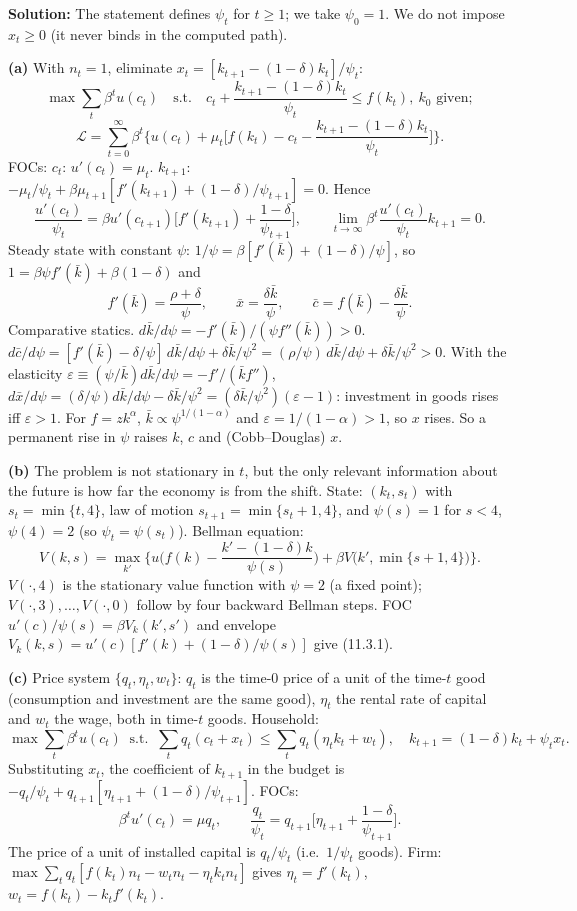 \documentclass[12pt, letterpaper]{article}
\newcommand{\kb}{\bar k}
\newcommand{\cb}{\bar c}
\begin{document}
\begin{tcolorbox}[oddbox,title={Exercise 11.3 \quad Anticipated productivity shift}]
\textbf{Solution:} The statement defines $\psi_t$ for $t\ge1$; we take $\psi_0=1$. We do not impose $x_t\ge0$ (it never
binds in the computed path).

\textbf{(a)} With $n_t=1$, eliminate $x_t=[k_{t+1}-(1-\delta)k_t]/\psi_t$:
\[
\max\sum_t\beta^tu(c_t)\quad\text{s.t.}\quad c_t+\frac{k_{t+1}-(1-\delta)k_t}{\psi_t}\le f(k_t),\ k_0\text{ given};
\]
\[
\mathcal L=\sum_{t=0}^\infty\beta^t\Big\{u(c_t)+\mu_t\Big[f(k_t)-c_t-\frac{k_{t+1}-(1-\delta)k_t}{\psi_t}\Big]\Big\}.
\]
FOCs: $c_t$: $u'(c_t)=\mu_t$. $k_{t+1}$: $-\mu_t/\psi_t+\beta\mu_{t+1}[f'(k_{t+1})+(1-\delta)/\psi_{t+1}]=0$. Hence
\[
\frac{u'(c_t)}{\psi_t}=\beta u'(c_{t+1})\Big[f'(k_{t+1})+\frac{1-\delta}{\psi_{t+1}}\Big],\qquad
\lim_{t\to\infty}\beta^t\frac{u'(c_t)}{\psi_t}k_{t+1}=0 .\tag{11.3.1}
\]
Steady state with constant $\psi$: $1/\psi=\beta[f'(\kb)+(1-\delta)/\psi]$, so $1=\beta\psi f'(\kb)+\beta(1-\delta)$ and
\[
f'(\kb)=\frac{\rho+\delta}{\psi},\qquad \bar x=\frac{\delta\kb}{\psi},\qquad \cb=f(\kb)-\frac{\delta\kb}{\psi}.
\]
Comparative statics. $d\kb/d\psi=-f'(\kb)/(\psi f''(\kb))>0$.
$d\cb/d\psi=[f'(\kb)-\delta/\psi]\,d\kb/d\psi+\delta\kb/\psi^2=(\rho/\psi)\,d\kb/d\psi+\delta\kb/\psi^2>0$.
With the elasticity $\varepsilon\equiv(\psi/\kb)d\kb/d\psi=-f'/(\kb f'')$,
$d\bar x/d\psi=(\delta/\psi)d\kb/d\psi-\delta\kb/\psi^2=(\delta\kb/\psi^2)(\varepsilon-1)$: investment in goods rises iff
$\varepsilon>1$. For $f=zk^\alpha$, $\kb\propto\psi^{1/(1-\alpha)}$ and $\varepsilon=1/(1-\alpha)>1$, so $x$ rises. So
a permanent rise in $\psi$ raises $k$, $c$ and (Cobb--Douglas) $x$.

\textbf{(b)} The problem is not stationary in $t$, but the only relevant information about the future is how far the
economy is from the shift. State: $(k_t,s_t)$ with $s_t=\min\{t,4\}$, law of motion $s_{t+1}=\min\{s_t+1,4\}$, and
$\psi(s)=1$ for $s<4$, $\psi(4)=2$ (so $\psi_t=\psi(s_t)$). Bellman equation:
\[
V(k,s)=\max_{k'}\Big\{u\Big(f(k)-\frac{k'-(1-\delta)k}{\psi(s)}\Big)+\beta V\big(k',\min\{s+1,4\}\big)\Big\}.
\]
$V(\cdot,4)$ is the stationary value function with $\psi=2$ (a fixed point); $V(\cdot,3),\dots,V(\cdot,0)$ follow by four
backward Bellman steps. FOC $u'(c)/\psi(s)=\beta V_k(k',s')$ and envelope
$V_k(k,s)=u'(c)[f'(k)+(1-\delta)/\psi(s)]$ give (11.3.1).

\textbf{(c)} Price system $\{q_t,\eta_t,w_t\}$: $q_t$ is the time-0 price of a unit of the time-$t$ good (consumption and
investment are the same good), $\eta_t$ the rental rate of capital and $w_t$ the wage, both in time-$t$ goods. Household:
\[
\max\sum_t\beta^tu(c_t)\ \text{ s.t. }\ \sum_tq_t(c_t+x_t)\le\sum_tq_t(\eta_tk_t+w_t),\quad k_{t+1}=(1-\delta)k_t+\psi_tx_t .
\]
Substituting $x_t$, the coefficient of $k_{t+1}$ in the budget is $-q_t/\psi_t+q_{t+1}[\eta_{t+1}+(1-\delta)/\psi_{t+1}]$.
FOCs:
\[
\beta^tu'(c_t)=\mu q_t,\qquad \frac{q_t}{\psi_t}=q_{t+1}\Big[\eta_{t+1}+\frac{1-\delta}{\psi_{t+1}}\Big].
\]
The price of a unit of installed capital is $q_t/\psi_t$ (i.e.\ $1/\psi_t$ goods). Firm: $\max\sum_tq_t[f(k_t)n_t-w_tn_t-\eta_tk_tn_t]$
gives $\eta_t=f'(k_t)$, $w_t=f(k_t)-k_tf'(k_t)$.


\end{tcolorbox}
\end{document}
